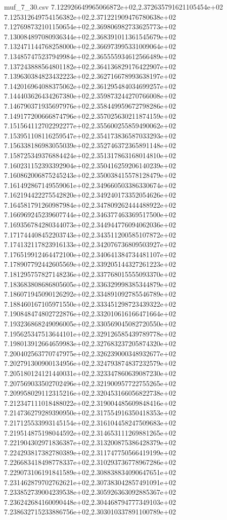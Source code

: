\begin{filecontents*}{muf_7_30.csv}
7.122926649965066872e+02,2.372635791621105454e+02
7.125312649754156382e+02,2.371221909476780638e+02
7.127698732101150654e+02,2.369806982733625773e+02
7.130084897080936344e+02,2.368391011361545679e+02
7.132471144768258000e+02,2.366973995331009064e+02
7.134857475237949984e+02,2.365555934612566489e+02
7.137243888564801182e+02,2.364136829176422907e+02
7.139630384823432223e+02,2.362716678993638197e+02
7.142016964088375062e+02,2.361295484034699257e+02
7.144403626434267380e+02,2.359873244270766008e+02
7.146790371935697976e+02,2.358449959672798286e+02
7.149177200666874796e+02,2.357025630211874159e+02
7.151564112702292277e+02,2.355600255859490062e+02
7.153951108116259547e+02,2.354173836587033293e+02
7.156338186983055039e+02,2.352746372365891148e+02
7.158725349376884424e+02,2.351317863168014810e+02
7.160231152393392904e+02,2.350416259206140239e+02
7.160862006875245243e+02,2.350038415578128479e+02
7.161492867149559061e+02,2.349660503386330674e+02
7.162194422275542820e+02,2.349240173352054626e+02
7.164581791260987984e+02,2.347809262444488922e+02
7.166969245239607744e+02,2.346377463369517500e+02
7.169356784280344073e+02,2.344944776094062036e+02
7.171744408452203743e+02,2.343511200585107872e+02
7.174132117823916133e+02,2.342076736809503927e+02
7.176519912464472100e+02,2.340641384734481107e+02
7.178907792442605569e+02,2.339205144327261223e+02
7.181295757827148236e+02,2.337768015555093370e+02
7.183683808686805605e+02,2.336329998385344879e+02
7.186071945090126292e+02,2.334891092785546789e+02
7.188460167105971550e+02,2.333451298723439322e+02
7.190848474802722876e+02,2.332010616166471664e+02
7.193236868249096005e+02,2.330569045082720550e+02
7.195625347513644101e+02,2.329126585439789778e+02
7.198013912664659983e+02,2.327683237205874320e+02
7.200402563770747975e+02,2.326239000348932677e+02
7.202791300900134956e+02,2.324793874837232579e+02
7.205180124121440031e+02,2.323347860639087230e+02
7.207569033502702496e+02,2.321900957722755265e+02
7.209958029112315216e+02,2.320453166056822738e+02
7.212347111018488022e+02,2.319004485609848416e+02
7.214736279289390950e+02,2.317554916350418353e+02
7.217125533993145154e+02,2.316104458247509683e+02
7.219514875198044592e+02,2.314653111269881265e+02
7.221904302971836387e+02,2.313200875386428379e+02
7.224293817382780389e+02,2.311747750566419199e+02
7.226683418498778337e+02,2.310293736778967286e+02
7.229073106191841589e+02,2.308838834090647651e+02
7.231462879702762621e+02,2.307383042857491091e+02
7.233852739004239538e+02,2.305926363092885367e+02
7.236242684160090448e+02,2.304468794777349103e+02
7.238632715233886756e+02,2.303010337891100789e+02

\end{filecontents*}
